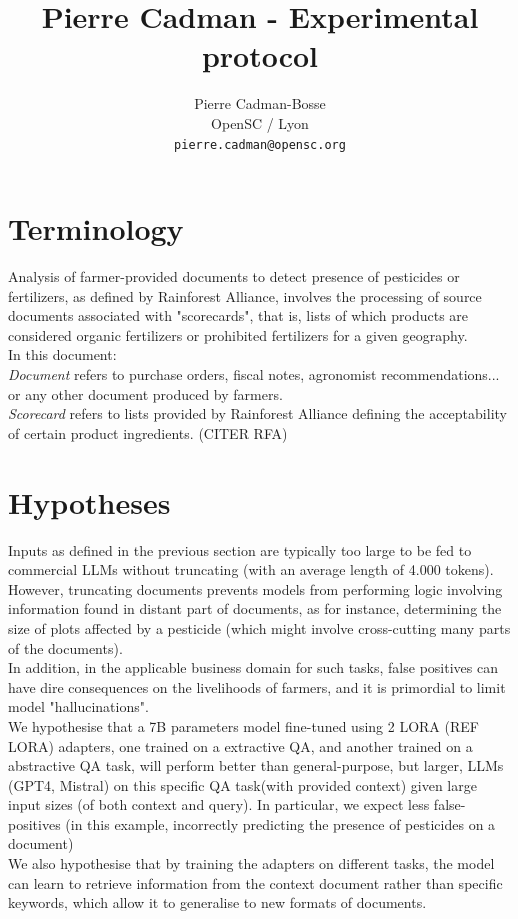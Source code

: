 \documentclass[11pt]{article}
\title{Pierre Cadman - Experimental protocol}
\author{Pierre Cadman-Bosse \\
  OpenSC / Lyon \\
  \texttt{pierre.cadman@opensc.org} 
}
\begin{document}
\maketitle

\section{Terminology}
Analysis of farmer-provided documents to detect presence of pesticides or fertilizers, as defined by Rainforest Alliance, involves the processing of source documents associated with "scorecards", that is, lists of which products are considered organic fertilizers or prohibited fertilizers for a given geography. \\
In this document:\\
\textit{Document} refers to purchase orders, fiscal notes, agronomist recommendations... or any other document produced by farmers.\\
\textit{Scorecard}  refers to lists provided by Rainforest Alliance defining the acceptability of certain product ingredients. (CITER RFA)

\section{Hypotheses} 
Inputs as defined in the previous section are typically too large to be fed to commercial LLMs without truncating (with an average length of 4.000 tokens). However, truncating documents prevents models from performing logic involving information found in distant part of documents, as for instance, determining the size of plots affected by a pesticide (which might involve cross-cutting many parts of the documents). \\
In addition, in the applicable business domain for such tasks, false positives can have dire consequences on the livelihoods of farmers, and it is primordial to limit model "hallucinations". \\
We hypothesise that a 7B parameters model fine-tuned using 2 LORA (REF LORA) adapters, one trained on a extractive QA, and another trained on a abstractive QA task, will perform better than general-purpose, but larger, LLMs (GPT4, Mistral) on this specific QA task(with provided context) given large input sizes (of both context and query). In particular, we expect less false-positives (in this example, incorrectly predicting the presence of pesticides on a document)\\
We also hypothesise that by training the adapters on different tasks, the model can learn to retrieve information from the context document rather than specific keywords, which allow it to generalise to new formats of documents.
\end{document}
